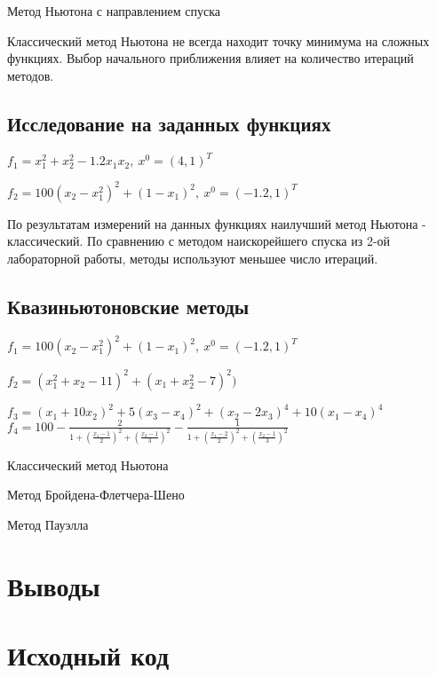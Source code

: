 Метод Ньютона с направлением спуска\\


Классический метод Ньютона не всегда находит точку минимума на сложных функциях.
Выбор начального приближения влияет на количество итераций методов.

\subsection{Исследование на заданных функциях}
\(f_1 = x_1^2 + x_2^2 - 1.2x_1x_2,\ x^0 = (4, 1)^T\) \\

\(f_2 = 100(x_2 - x_1^2)^2 + (1 - x_1)^2,\ x^0 = (-1.2, 1)^T\)	


По результатам измерений на данных функциях наилучший метод Ньютона - классический. По сравнению с методом наискорейшего спуска из 2-ой лабораторной работы, методы используют меньшее число итераций.
\subsection{Квазиньютоновские методы}
\(f_1 = 100(x_2 - x_1^2)^2 + (1 - x_1)^2,\ x^0 = (-1.2, 1)^T\)\\

\(f_2 = (x_1^2 + x_2 - 11)^2 + (x_1 + x_2^2 - 7)^2)\)\\

\(f_3 = (x_1 + 10x_2)^2 + 5(x_3 - x_4)^2 + (x_2 - 2x_3)^4 + 10(x_1 - x_4)^4\)\\

\(f_4 = 100 - \frac{2}{1 + (\frac{x_1 - 1}{2})^2 + (\frac{x_2 - 1}{3})^2} - \frac{1}{1 + (\frac{x_1 - 2}{2})^2 + (\frac{x_2 - 1}{3})^2}\)\\

Классический метод Ньютона\\


Метод Бройдена-Флетчера-Шено\\

Метод Пауэлла\\

\section{Выводы}

\section{Исходный код}




